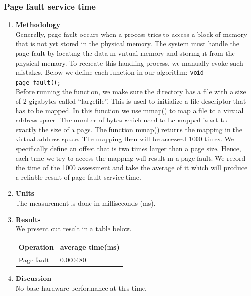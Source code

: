 \subsubsection{Page fault service time}
\begin{enumerate}[\bfseries (a), wide, labelwidth=!, labelindent=0pt]
    \item \textbf{Methodology}\\
    Generally, page fault occurs when a process tries to access a block of memory that is not yet stored in the physical memory. The system must handle the page fault by locating the data in virtual memory and storing it from the physical memory. To recreate this handling process, we manually evoke such mistakes. Below we define each function in our algorithm:
    \hline \hline 
    \noindent\texttt{void page_fault();}\\
    Before running the function, we make sure the directory has a file with a size of 2 gigabytes called “largefile”. This is used to initialize a file descriptor that has to be mapped. In this function we use mmap() to map a file to a virtual address space. The number of bytes which need to be mapped is set to exactly the size of a page. The function mmap() returns the mapping in the virtual address space. The mapping then will be accessed 1000 times. We specifically define an offset that is two times larger than a page size. Hence, each time we try to access the mapping will result in a page fault. We record the time of the 1000 assessment and take the average of it which will produce a reliable result of page fault service time.
    \hline \hline 
    \item \textbf{Units}\\
    The measurement is done in milliseconds (ms).
    \item \textbf{Results}\\
    We present out result in a table below.
    \begin{table}[h]
\begin{tabular}{|l|l|}
\hline
\textbf{Operation} & \textbf{average time(ms)} \\ \hline
Page fault         & 0.000480                  \\ \hline
\end{tabular}
\end{table}
\newline
    \item \textbf{Discussion}\\
    No base hardware performance at this time.\\

\end{enumerate}

